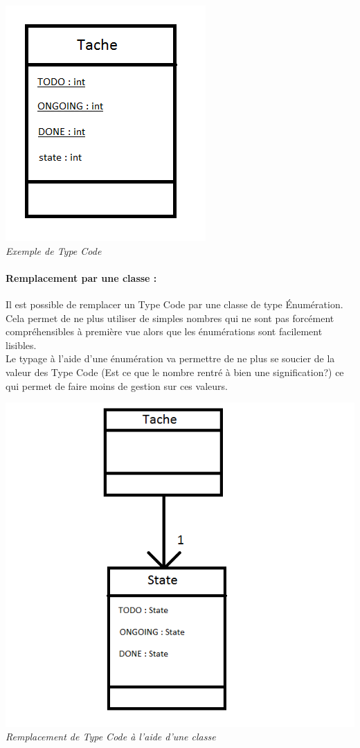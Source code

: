 \documentclass[a4paper,twoside,12pt,openright]{report}
\begin{document}
\begin{center}
\includegraphics[scale=1]{Image/TypeCode.png}\\
\itshape{Exemple de Type Code}
\end{center}

\paragraph{Remplacement par une classe :}
Il est possible de remplacer un Type Code par une classe de type Énumération.\\
Cela permet de ne plus utiliser de simples nombres qui ne sont pas forcément compréhensibles à première vue alors que les énumérations sont facilement lisibles.\\
Le typage à l'aide d'une énumération va permettre de ne plus se soucier de la valeur des Type Code (Est ce que le nombre rentré à bien une signification?) ce qui permet de faire moins de gestion sur ces valeurs.

\begin{center}
\includegraphics[scale=1]{Image/TypeCodeClasse.png}\\
\itshape{Remplacement de Type Code à l'aide d'une classe}
\end{center}
\end{document}
